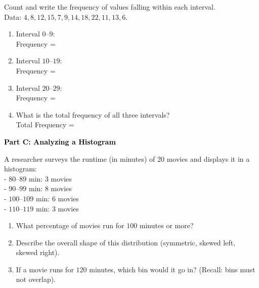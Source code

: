 \documentclass[12pt, letterpaper, fleqn]{article}
\newcommand{\blankshorter}{\underline{\hspace{1.5cm}}}
\begin{document}
\vspace{3mm}

\noindent
Count and write the frequency of values falling within each interval. \\
Data: $4, 8, 12, 15, 7, 9, 14, 18, 22, 11, 13, 6$.

\vspace{5mm}

\begin{enumerate}[itemsep=3cm, leftmargin=0.6cm]
\item Interval $0\text{--}9$: \\
Frequency = \blankshorter

\item Interval $10\text{--}19$: \\
Frequency = \blankshorter

\item Interval $20\text{--}29$: \\
Frequency = \blankshorter

\item What is the total frequency of all three intervals? \\
Total Frequency = \blankshorter
\end{enumerate}

\newpage

\begin{tcolorbox}[colback=black!10]
    \large\textcolor{black}{\textbf{Part C: Analyzing a Histogram}}
\end{tcolorbox}

\vspace{3mm}

\noindent
A researcher surveys the runtime (in minutes) of 20 movies and displays it in a histogram: \\
- $80\text{--}89$ min: 3 movies \\
- $90\text{--}99$ min: 8 movies \\
- $100\text{--}109$ min: 6 movies \\
- $110\text{--}119$ min: 3 movies

\vspace{5mm}

\begin{enumerate}[itemsep=2.5cm, leftmargin=0.6cm]
\item What percentage of movies run for $100$ minutes or more? \\
\vspace{2cm}

\item Describe the overall shape of this distribution (symmetric, skewed left, skewed right). \\
\vspace{2cm}

\item If a movie runs for $120$ minutes, which bin would it go in? (Recall: bins must not overlap). \\

\end{enumerate}
\end{document}
